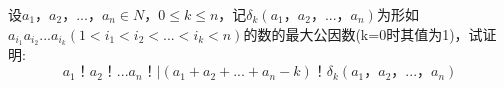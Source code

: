
设$a_{1}，a_{2}，...，a_{n} \in N$，$0\le k\le n$，记$\delta _{k}(a_{1}，a_{2}，...，a_{n})$为形如$a_{i_{1}}a_{i_{2}}...a_{i_{k}}(1<i_{1}<i_{2}< ...<i_{k}<n)$的数的最大公因数(k=0时其值为1)，试证明:$$a_{1}！a_{2}！...a_{n}！|(a_{1}+a_{2}+...+a_{n}-k)！\delta _{k}(a_{1}，a_{2}，...，a_{n})$$